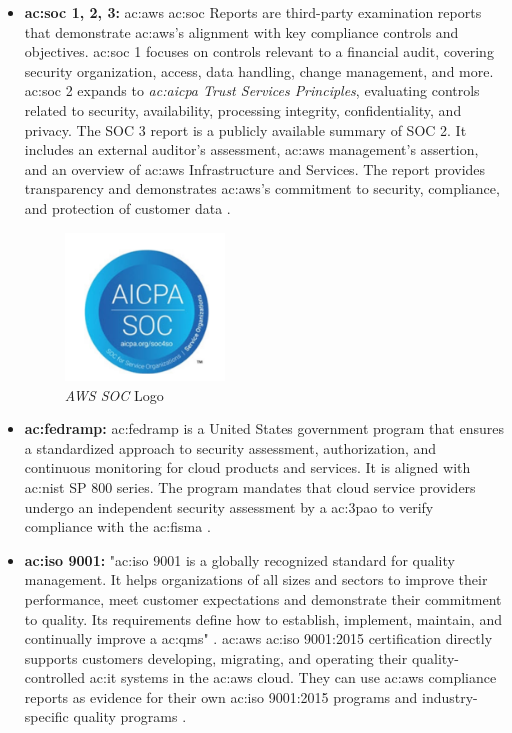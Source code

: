 \begin{itemize}
    \item \textbf{\gls{ac:soc} 1, 2, 3: } \gls{ac:aws} \gls{ac:soc} Reports are third-party examination reports that demonstrate \gls{ac:aws}'s alignment with key compliance controls and objectives. \gls{ac:soc} 1 focuses on controls relevant to a financial audit, covering security organization, access, data handling, change management, and more. \gls{ac:soc} 2 expands to \textit{\gls{ac:aicpa} Trust Services Principles}, evaluating controls related to security, availability, processing integrity, confidentiality, and privacy. The SOC 3 report is a publicly available summary of SOC 2. It includes an external auditor's assessment, \gls{ac:aws} management's assertion, and an overview of \gls{ac:aws} Infrastructure and Services. The report provides transparency and demonstrates \gls{ac:aws}'s commitment to security, compliance, and protection of customer data \cite{AWSSOC3}.
    \begin{figure}[h]  %
        \centering
        \includegraphics[width=0.4\textwidth]{images/AWSSOC.png}  %
        \caption{\textit{AWS SOC} Logo}
        \label{fig:AWSSOC}
    \end{figure}
    \item \textbf{\gls{ac:fedramp}:} \gls{ac:fedramp} is a United States government program that ensures a standardized approach to security assessment, authorization, and continuous monitoring for cloud products and services. It is aligned with \gls{ac:nist} SP 800 series. The program mandates that cloud service providers undergo an independent security assessment by a \gls{ac:3pao} to verify compliance with the  \gls{ac:fisma} \cite{Fedramp}.
    \item \textbf{\gls{ac:iso} 9001:} "\gls{ac:iso} 9001 is a globally recognized standard for quality management. It helps organizations of all sizes and sectors to improve their performance, meet customer expectations and demonstrate their commitment to quality. Its requirements define how to establish, implement, maintain, and continually improve a \gls{ac:qms}" \cite{ISO9001}. \gls{ac:aws} \gls{ac:iso} 9001:2015 certification directly supports customers developing, migrating, and operating their quality-controlled \gls{ac:it} systems in the \gls{ac:aws} cloud. They can use \gls{ac:aws} compliance reports as evidence for their own \gls{ac:iso} 9001:2015 programs and industry-specific quality programs \cite{AWSISO9001}.

\end{itemize}
